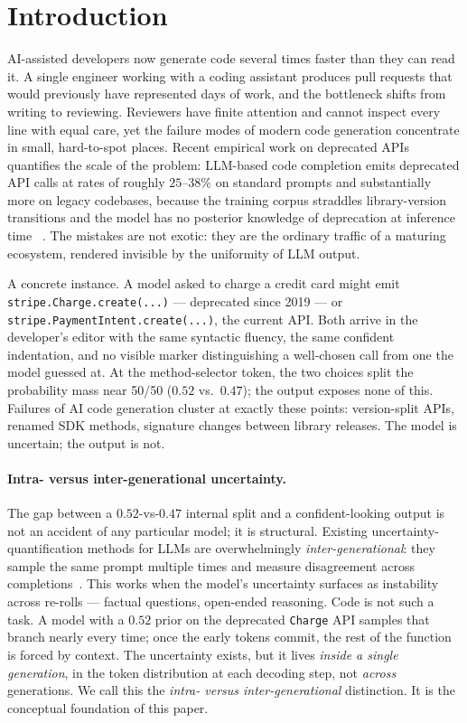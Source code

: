 \section{Introduction}
\label{sec:introduction}

AI-assisted developers now generate code several times faster than they can
read it. A single engineer working with a coding assistant produces pull
requests that would previously have represented days of work, and the
bottleneck shifts from writing to reviewing. Reviewers have finite
attention and cannot inspect every line with equal care, yet the failure
modes of modern code generation concentrate in small, hard-to-spot places.
Recent empirical work on deprecated APIs quantifies the scale of the
problem: LLM-based code completion emits deprecated API calls at rates of
roughly $25$--$38\%$ on standard prompts and substantially more on legacy
codebases, because the training corpus straddles library-version transitions
and the model has no posterior knowledge of deprecation at inference time~%
\cite{wang2025deprecated}. The mistakes are not exotic: they are the
ordinary traffic of a maturing ecosystem, rendered invisible by the
uniformity of LLM output.

A concrete instance. A model asked to charge a credit card might emit
\texttt{stripe.Charge.create(...)} --- deprecated since 2019 --- or
\texttt{stripe.PaymentIntent.create(...)}, the current API. Both arrive in
the developer's editor with the same syntactic fluency, the same confident
indentation, and no visible marker distinguishing a well-chosen call from
one the model guessed at. At the method-selector token, the two choices
split the probability mass near 50/50 ($0.52$ vs.\ $0.47$); the output
exposes none of this. Failures of AI code generation cluster at exactly
these points: version-split APIs, renamed SDK methods, signature changes
between library releases. The model is uncertain; the output is not.

\paragraph{Intra- versus inter-generational uncertainty.}
The gap between a $0.52$-vs-$0.47$ internal split and a confident-looking
output is not an accident of any particular model; it is structural.
Existing uncertainty-quantification methods for LLMs are overwhelmingly
\emph{inter-generational}: they sample the same prompt multiple times and
measure disagreement across completions~\cite{kuhn2023semantic,uqlm2024}.
This works when the model's uncertainty surfaces as instability across
re-rolls --- factual questions, open-ended reasoning. Code is not such a
task. A model with a $0.52$ prior on the deprecated \texttt{Charge} API
samples that branch nearly every time; once the early tokens commit, the
rest of the function is forced by context. The uncertainty exists, but it
lives \emph{inside a single generation}, in the token distribution at each
decoding step, not \emph{across} generations. We call this the
\emph{intra- versus inter-generational} distinction. It is the conceptual
foundation of this paper.


